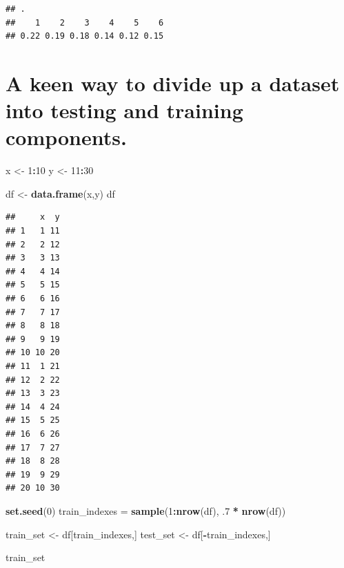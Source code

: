 \documentclass[]{book}
\newenvironment{Shaded}{\begin{snugshade}}{\end{snugshade}}
\newcommand{\DataTypeTok}[1]{\textcolor[rgb]{0.13,0.29,0.53}{#1}}
\newcommand{\DecValTok}[1]{\textcolor[rgb]{0.00,0.00,0.81}{#1}}
\newcommand{\FloatTok}[1]{\textcolor[rgb]{0.00,0.00,0.81}{#1}}
\newcommand{\KeywordTok}[1]{\textcolor[rgb]{0.13,0.29,0.53}{\textbf{#1}}}
\newcommand{\NormalTok}[1]{#1}
\newcommand{\OperatorTok}[1]{\textcolor[rgb]{0.81,0.36,0.00}{\textbf{#1}}}
\newcommand{\OtherTok}[1]{\textcolor[rgb]{0.56,0.35,0.01}{#1}}
\newcommand{\StringTok}[1]{\textcolor[rgb]{0.31,0.60,0.02}{#1}}
\begin{document}
\begin{Shaded}
\end{Shaded}

\begin{verbatim}
## .
##    1    2    3    4    5    6 
## 0.22 0.19 0.18 0.14 0.12 0.15
\end{verbatim}

\hypertarget{a-keen-way-to-divide-up-a-dataset-into-testing-and-training-components.}{%
\section{A keen way to divide up a dataset into testing and training components.}\label{a-keen-way-to-divide-up-a-dataset-into-testing-and-training-components.}}

\begin{Shaded}
\begin{Highlighting}[]
\NormalTok{x <-}\StringTok{ }\DecValTok{1}\OperatorTok{:}\DecValTok{10}
\NormalTok{y <-}\StringTok{ }\DecValTok{11}\OperatorTok{:}\DecValTok{30}

\NormalTok{df <-}\StringTok{ }\KeywordTok{data.frame}\NormalTok{(x,y)}
\NormalTok{df}
\end{Highlighting}
\end{Shaded}

\begin{verbatim}
##     x  y
## 1   1 11
## 2   2 12
## 3   3 13
## 4   4 14
## 5   5 15
## 6   6 16
## 7   7 17
## 8   8 18
## 9   9 19
## 10 10 20
## 11  1 21
## 12  2 22
## 13  3 23
## 14  4 24
## 15  5 25
## 16  6 26
## 17  7 27
## 18  8 28
## 19  9 29
## 20 10 30
\end{verbatim}

\begin{Shaded}
\begin{Highlighting}[]
\KeywordTok{set.seed}\NormalTok{(}\DecValTok{0}\NormalTok{)}
\NormalTok{train_indexes =}\StringTok{ }\KeywordTok{sample}\NormalTok{(}\DecValTok{1}\OperatorTok{:}\KeywordTok{nrow}\NormalTok{(df), }\FloatTok{.7} \OperatorTok{*}\StringTok{ }\KeywordTok{nrow}\NormalTok{(df))}

\NormalTok{train_set <-}\StringTok{ }\NormalTok{df[train_indexes,]}
\NormalTok{test_set <-}\StringTok{ }\NormalTok{df[}\OperatorTok{-}\NormalTok{train_indexes,]}

\NormalTok{train_set}
\end{Highlighting}
\end{Shaded}
\end{document}
